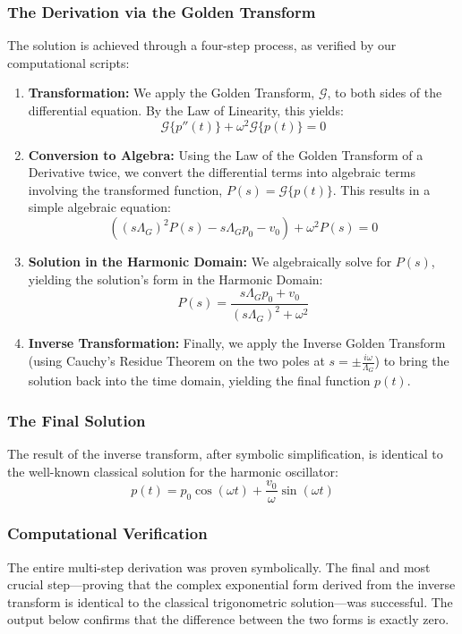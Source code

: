 \subsubsection*{The Derivation via the Golden Transform}
The solution is achieved through a four-step process, as verified by our computational scripts:
\begin{enumerate}
    \item \textbf{Transformation:} We apply the Golden Transform, $\mathcal{G}$, to both sides of the differential equation. By the Law of Linearity, this yields:
    $$ \mathcal{G}\{p''(t)\} + \omega^2 \mathcal{G}\{p(t)\} = 0 $$
    \item \textbf{Conversion to Algebra:} Using the Law of the Golden Transform of a Derivative twice, we convert the differential terms into algebraic terms involving the transformed function, $P(s) = \mathcal{G}\{p(t)\}$. This results in a simple algebraic equation:
    $$ \left( (s\Lambda_G)^2 P(s) - s\Lambda_G p_0 - v_0 \right) + \omega^2 P(s) = 0 $$
    \item \textbf{Solution in the Harmonic Domain:} We algebraically solve for $P(s)$, yielding the solution's form in the Harmonic Domain:
    $$ P(s) = \frac{s\Lambda_G p_0 + v_0}{(s\Lambda_G)^2 + \omega^2} $$
    \item \textbf{Inverse Transformation:} Finally, we apply the Inverse Golden Transform (using Cauchy's Residue Theorem on the two poles at $s=\pm \frac{i\omega}{\Lambda_G}$) to bring the solution back into the time domain, yielding the final function $p(t)$.
\end{enumerate}

\subsubsection*{The Final Solution}
The result of the inverse transform, after symbolic simplification, is identical to the well-known classical solution for the harmonic oscillator:
$$ p(t) = p_0 \cos(\omega t) + \frac{v_0}{\omega}\sin(\omega t) $$

\subsubsection*{Computational Verification}
The entire multi-step derivation was proven symbolically. The final and most crucial step—proving that the complex exponential form derived from the inverse transform is identical to the classical trigonometric solution—was successful. The output below confirms that the difference between the two forms is exactly zero.

